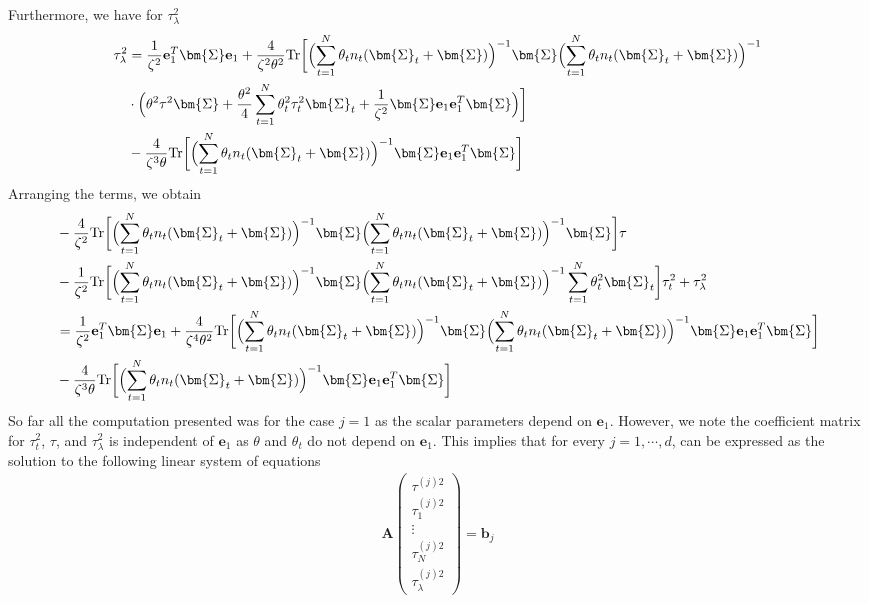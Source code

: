 \documentclass[final]{l4dc2026}
\newcommand{\bSigma}{\bm{\Sigma}}
\newcommand{\bA}{\mathbf{A}}
\newcommand{\bb}{\mathbf{b}}
\newcommand{\be}{\mathbf{e}}
\newcommand{\tr}{\text{Tr}}
\begin{document}
Furthermore, we have for $\tau_{\lambda}^2$
\begin{align*}
    \tau_{\lambda}^2 &= \frac{1}{\zeta^2} \be_1^T \bSigma \be_1 + \frac{4}{\zeta^2 \theta^2} \tr \biggl[\Bigl(\sum_{t=1}^N \theta_t n_t (\bSigma_t + \bSigma) \Bigr)^{-1} \bSigma \Bigl(\sum_{t=1}^N \theta_t n_t (\bSigma_t + \bSigma) \Bigr)^{-1} \nonumber\\
      &\cdot \Bigl(\theta^2 \tau^2 \bSigma + \frac{\theta^2}{4} \sum_{t=1}^N \theta^2_t \tau_t^2 \bSigma_t  + \frac{1}{\zeta^2}\bSigma \be_1 \be_1^T \bSigma\Bigr) \biggr] \\
      &- \frac{4}{\zeta^3 \theta} \tr\biggl[\Bigl(\sum_{t=1}^N \theta_t n_t (\bSigma_t + \bSigma) \Bigr)^{-1}  \bSigma \be_1 \be_1^T \bSigma\biggr]
\end{align*}
Arranging the terms, we obtain
\begin{align}\label{eq: tau_lam}
    &- \frac{4}{\zeta^2} \tr \biggl[ \Bigl(\sum_{t=1}^N \theta_t n_t (\bSigma_t + \bSigma) \Bigr)^{-1} \bSigma \Bigl(\sum_{t=1}^N \theta_t n_t (\bSigma_t + \bSigma) \Bigr)^{-1} \bSigma \biggr] \tau \nonumber\\
      &- \frac{1}{\zeta^2} \tr \biggl[\Bigl(\sum_{t=1}^N \theta_t n_t (\bSigma_t + \bSigma) \Bigr)^{-1} \bSigma \Bigl(\sum_{t=1}^N \theta_t n_t (\bSigma_t + \bSigma) \Bigr)^{-1} \sum_{t=1}^N \theta_t^2 \bSigma_t \biggr] \tau_t^2 + \tau_{\lambda}^2 \nonumber \\ 
      &= \frac{1}{\zeta^2} \be_1^T \bSigma \be_1 + \frac{4}{\zeta^4 \theta^2} \tr \biggl[\Bigl(\sum_{t=1}^N \theta_t n_t (\bSigma_t + \bSigma) \Bigr)^{-1} \bSigma \Bigl(\sum_{t=1}^N \theta_t n_t (\bSigma_t + \bSigma) \Bigr)^{-1}  \bSigma \be_1 \be_1^T \bSigma \biggr] \nonumber \\
      &-  \frac{4}{\zeta^3 \theta} \tr\biggl[\Bigl(\sum_{t=1}^N \theta_t n_t (\bSigma_t + \bSigma) \Bigr)^{-1}  \bSigma \be_1 \be_1^T \bSigma\biggr]
\end{align}
So far all the computation presented was for the case $j=1$ as the scalar parameters depend on $\be_1$. However, we note the coefficient matrix for $\tau_t^2$, $\tau$, and $\tau_{\lambda}^2$ is independent of $\be_1$ as $\theta$ and $\theta_t$ do not depend on $\be_1$. This implies that for every $j=1,\cdots, d$, can be expressed as the solution to the following linear system of equations
\begin{align*}
    \bA \begin{pmatrix}
        \tau^{(j)2} \\
        \tau^{(j)2}_1 \\
        \vdots \\
        \tau^{(j)2}_N \\
        \tau^{(j)2}_{\lambda}
    \end{pmatrix} = \bb_j
\end{align*}
\end{document}
